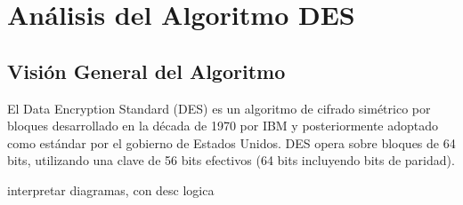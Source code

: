 \section{Análisis del Algoritmo DES}

\subsection{Visión General del Algoritmo}

El Data Encryption Standard (DES) es un algoritmo de cifrado simétrico por bloques desarrollado en la década de 1970 por IBM y posteriormente adoptado como estándar por el gobierno de Estados Unidos. DES opera sobre bloques de 64 bits, utilizando una clave de 56 bits efectivos (64 bits incluyendo bits de paridad).

interpretar diagramas, con desc logica




